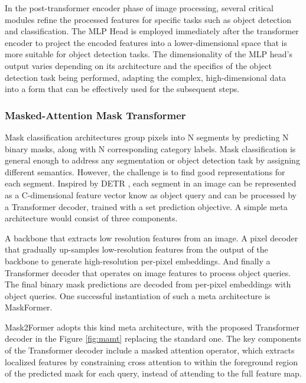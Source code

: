 In the post-transformer encoder phase of image processing, several critical modules refine the processed features for specific tasks such as object detection 
and classification. The MLP Head is employed immediately after the transformer encoder to project the encoded features into a lower-dimensional space that 
is more suitable for object detection tasks. The dimensionality of the MLP head's output varies depending on its architecture and the specifics of the object 
detection task being performed, adapting the complex, high-dimensional data into a form that can be effectively used for the subsequent steps.

\newpage
\subsubsection{Masked-Attention Mask Transformer} \label{mamt}

Mask classification architectures group pixels into N segments by predicting N binary masks, along with N corresponding category labels. 
Mask classification is general enough to address any segmentation or object detection task by assigning different semantics.
However, the  challenge is to find good representations for each segment. Inspired by DETR \cite{e2evisiontr}, each segment in an image can be represented as a 
C-dimensional feature vector know as object query and can be processed by a Transformer decoder, trained with a set prediction objective. A simple meta 
architecture would consist of three components. 

A backbone that extracts low resolution features from an image. A pixel decoder that gradually up-samples low-resolution features from the output of the 
backbone to generate high-resolution per-pixel embeddings. And finally a Transformer decoder that operates on image features to process object queries. 
The final binary mask predictions are decoded from per-pixel embeddings with object queries. One successful instantiation of such a meta architecture is 
MaskFormer\cite{mamt}.


Mask2Former adopts this kind meta architecture, with the proposed Transformer decoder in the Figure \ref{fig:mamt} replacing the standard one. The key 
components of the Transformer decoder include a masked attention operator, which extracts localized features by constraining cross attention to within the 
foreground region of the predicted mask for each query, instead of attending to the full feature map. 

